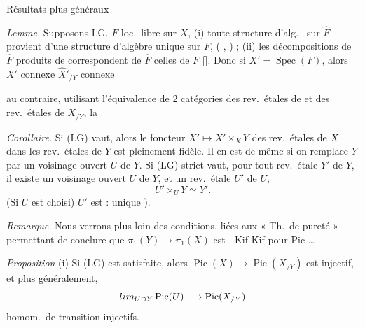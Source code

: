 \documentclass[11pt,a4paper]{article}
\begin{document}
Résultats \ill{} \ill{} plus généraux

 \emph{Lemme.} Supposons LG.  $F$ loc.\ libre sur $X$, (i) toute structure d'alg.\ \struck{[\ill{} \ill{}, \ill{} \ill{}]} sur $\hat{F}$ provient d'une structure \struck{\ill{}} d'algèbre unique sur $F$, \ill{} \ill{} \ill{} (\ill{} \ill{}, \ill{} \ill{}) \ill{} \ill{} \ill{} ; (ii) les décompositions de $\hat{F}$ \struck{\ill{}} \ill{} produits de  \ill{} \ill{} correspondent \ill{} \ill{} \ill{} \ill{} de $\hat{F}$ \ill{} celles de $F$ [\ill{}]. Donc si $X' = \operatorname{Spec}(F)$, alors $X'$ connexe  $\hat{X}'_{/Y}$ connexe

 au contraire, utilisant l'équivalence de 2 catégories des rev.\ étales de  \ill{} et des rev.\ étales de $X_{/Y}$, la

\emph{Corollaire.} Si (LG) vaut, alors le foncteur $X' \mapsto X' \times_X Y$ des rev.\ étales de $X$ dans les rev.\ étales de $Y$ est pleinement fidèle.  Il en est de même si on remplace $Y$ par un voisinage ouvert $U$ de $Y$. Si (LG) strict vaut,  pour tout rev.\ étale $Y'$ de $Y$, il existe un \struck{\ill{}} voisinage ouvert $U$ de $Y$, et un rev.\ étale $U'$ de $U$,  \add{\ill{}} 
\[
  U' \times_U Y \simeq Y' .
\]
(Si $U$ est choisi) $U'$ est   :  unique ).

\emph{Remarque.} Nous verrons plus loin des conditions, liées aux « Th.\ de pureté » permettant de conclure que $\pi_1(Y) \to \pi_1(X)$ est  . Kif-Kif pour Pic \ldots
{}

\emph{Proposition} (i) Si (LG) est satisfaite, alors   $\operatorname{Pic}(X) \to \operatorname{Pic}(X_{/Y})$ est injectif, \struck{\ill{}} et plus généralement, \ill{} \ill{} 
\[
  \varinjlim_{U \supset Y} \operatorname{Pic}(U) \longrightarrow \operatorname{Pic}(X_{/Y})
\]
\ill{} \ill{} homom.\ de transition injectifs.
\end{document}
